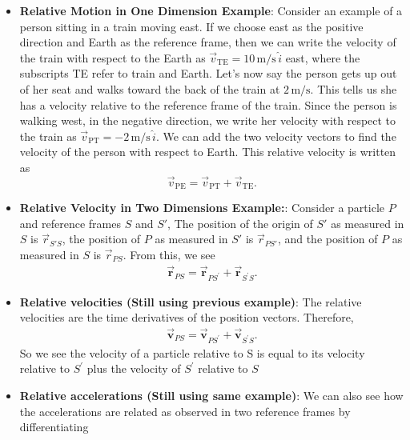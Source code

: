 \documentclass{report}
\begin{document}
\begin{itemize}
            \item \textbf{Relative Motion in One Dimension Example}:
                Consider an example of a person sitting in a train moving east. If we choose east as the positive direction and Earth as the reference frame, then we can write the velocity of the train with respect to the Earth as $\vec{v}_{\text{TE}} = 10 \, \text{m/s} \, \hat{i}$ east, where the subscripts TE refer to train and Earth. Let’s now say the person gets up out of her seat and walks toward the back of the train at $2 \, \text{m/s}$. This tells us she has a velocity relative to the reference frame of the train. Since the person is walking west, in the negative direction, we write her velocity with respect to the train as $\vec{v}_{\text{PT}} = -2 \, \text{m/s} \, \hat{i}$. We can add the two velocity vectors to find the velocity of the person with respect to Earth. This relative velocity is written as
                \[
                    \vec{v}_{\text{PE}} = \vec{v}_{\text{PT}} + \vec{v}_{\text{TE}}.
                \]
            \item \textbf{Relative Velocity in Two Dimensions Example:}:
                Consider a particle \(P\) and reference frames \(S\) and \(S'\), The position of the origin of \(S'\)
                as measured in \(S\) is \(\vec{r}_{S'S}\),
                the position of \(P\) as measured in \(S'\)
                is \(\vec{r}_{PS'}\),
                and the position of \(P\) as measured in \(S\) is \(\vec{r}_{PS}\).
                \bigbreak \noindent 
                \bigbreak \noindent 
                From this, we see 
                \begin{align*}
                    \vec{\mathbf{r}}_{PS} = \vec{\mathbf{r}}_{PS^{\prime}} + \vec{\mathbf{r}}_{S^{\prime}S}
                .\end{align*}
        \item \textbf{Relative velocities (Still using previous example)}: The relative velocities are the time derivatives of the position vectors. Therefore,
            \begin{align*}
                    \vec{\mathbf{v}}_{PS} = \vec{\mathbf{v}}_{PS^{\prime}} + \vec{\mathbf{v}}_{S^{\prime}S}
            .\end{align*}
            \bigbreak \noindent 
            So we see the velocity of a particle relative to S is equal to its velocity relative to  $S^{\prime}$ plus the velocity of $S^{\prime}$ relative to $S$
        \item \textbf{Relative accelerations (Still using same example)}:  We can also see how the accelerations are related as observed in two reference frames by differentiating

\end{itemize}
\end{document}
